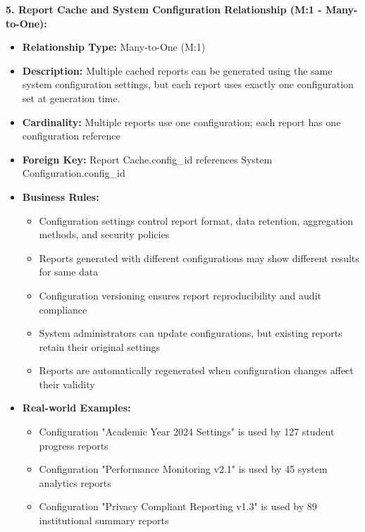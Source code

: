 \documentclass[12pt,a4paper,oneside]{book}
\begin{document}
\textbf{5. Report Cache and System Configuration Relationship (M:1 - Many-to-One):}
\begin{itemize}
    \item \textbf{Relationship Type:} Many-to-One (M:1)
    \item \textbf{Description:} Multiple cached reports can be generated using the same system configuration settings, but each report uses exactly one configuration set at generation time.
    \item \textbf{Cardinality:} Multiple reports use one configuration; each report has one configuration reference
    \item \textbf{Foreign Key:} Report Cache.config\_id references System Configuration.config\_id
    \item \textbf{Business Rules:}
        \begin{itemize}
            \item Configuration settings control report format, data retention, aggregation methods, and security policies
            \item Reports generated with different configurations may show different results for same data
            \item Configuration versioning ensures report reproducibility and audit compliance
            \item System administrators can update configurations, but existing reports retain their original settings
            \item Reports are automatically regenerated when configuration changes affect their validity
        \end{itemize}
    \item \textbf{Real-world Examples:}
        \begin{itemize}
            \item Configuration "Academic Year 2024 Settings" is used by 127 student progress reports
            \item Configuration "Performance Monitoring v2.1" is used by 45 system analytics reports
            \item Configuration "Privacy Compliant Reporting v1.3" is used by 89 institutional summary reports
        \end{itemize}
\end{itemize}
\end{document}
